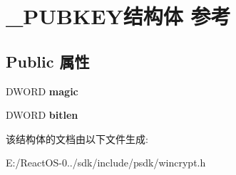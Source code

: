 \hypertarget{struct___p_u_b_k_e_y}{}\section{\+\_\+\+P\+U\+B\+K\+E\+Y结构体 参考}
\label{struct___p_u_b_k_e_y}
\subsection*{Public 属性}
\begin{DoxyCompactItemize}
\item 
\mbox{\label{struct___p_u_b_k_e_y_a3cf4c6cbe16756f2a99147fe25d179ad}} 
D\+W\+O\+RD {\bfseries magic}
\item 
\mbox{\label{struct___p_u_b_k_e_y_ac69431b16499d2e3c164de81f6737157}} 
D\+W\+O\+RD {\bfseries bitlen}
\end{DoxyCompactItemize}


该结构体的文档由以下文件生成\+:\begin{DoxyCompactItemize}
\item 
E\+:/\+React\+O\+S-\/0../sdk/include/psdk/wincrypt.\+h\end{DoxyCompactItemize}
